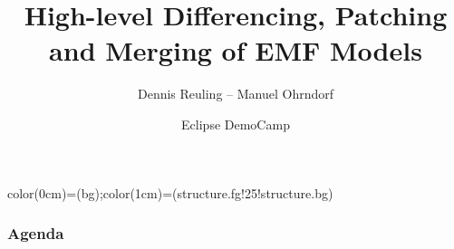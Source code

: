 \documentclass[10pt]{beamer}
\title[SiLift]{High-level Differencing, Patching and Merging of EMF Models}
\author[D. Reuling \\ M. Ohrndorf]{Dennis Reuling -- Manuel Ohrndorf}
\date[18.11.2013]{Eclipse DemoCamp}
\begin{document}
 {color(0cm)=(bg);color(1cm)=(structure.fg!25!structure.bg)}

\begingroup
\makeatletter
\beamertemplatenavigationsymbolsempty
\makeatother
\begin{frame}[plain]
    \titlepage
\end{frame}
\endgroup

\setcounter{tocdepth}{1}


\begingroup
\makeatletter
{}
\makeatother
\begin{frame}
  \frametitle{Agenda}
  \tableofcontents
\end{frame}
\endgroup

\AtBeginSection[]%
{%
\frame{\sectionpage}
}





\end{document}
